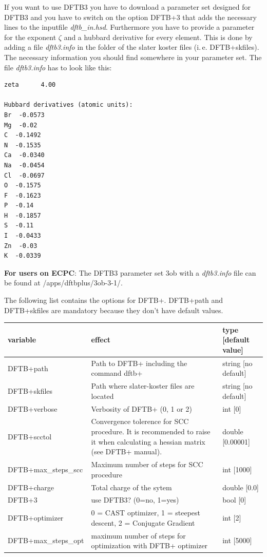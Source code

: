 \documentclass[10pt,a4paper]{article} %
\begin{document}
If you want to use DFTB3 you have to download a parameter set designed for DFTB3 and you have to switch on the option DFTB+3 that adds the necessary lines to the inputfile \textit{dftb\_in.hsd}. Furthermore you have to provide a parameter for the exponent $\zeta$ and a hubbard derivative for every element. This is done by adding a file \textit{dftb3.info} in the folder of the slater koster files (i.\,e. DFTB+skfiles). The necessary information you should find somewhere in your parameter set. The file \textit{dftb3.info} has to look like this:

\begin{lstlisting}
zeta	  4.00	

Hubbard derivatives (atomic units):
Br  -0.0573	
Mg  -0.02
C  -0.1492	
N  -0.1535
Ca  -0.0340	
Na  -0.0454
Cl  -0.0697	
O  -0.1575
F  -0.1623	
P  -0.14
H  -0.1857	
S  -0.11
I  -0.0433	
Zn  -0.03
K  -0.0339		
\end{lstlisting}

\textbf{For users on ECPC}: The DFTB3 parameter set 3ob with a \textit{dftb3.info} file can be found at /apps/dftbplus/3ob-3-1/.


The following list contains the options for DFTB+. DFTB+path and DFTB+skfiles are mandatory because they don't have default values.

		\begin{longtable}{|p{3.5cm}|p{5cm}|p{3cm}|}
		variable & effect & type [default value] \\
		\hline
			DFTB+path  & Path to DFTB+ including the command dftb+ & string [no default]\\
			DFTB+skfiles  & Path where slater-koster files are located & string [no default]\\
			DFTB+verbose & Verbosity of DFTB+ (0, 1 or 2) & int [0]\\
			DFTB+scctol & Convergence tolerence for SCC procedure. It is recommended to raise it when calculating a hessian matrix (see DFTB+ manual). & double [0.00001]\\
      DFTB+max\_steps\_scc & Maximum number of steps for SCC procedure & int [1000]\\
			DFTB+charge & Total charge of the sytem & double [0.0] \\
			DFTB+3 & use DFTB3? (0=no, 1=yes) & bool [0] \\
			DFTB+optimizer & 0 = CAST optimizer, 1 = steepest descent, 2 = Conjugate Gradient & int [2] \\
			DFTB+max\_steps\_opt & maximum number of steps for optimization with DFTB+ optimizer & int [5000] \\
		\end{longtable}~\\
		
\end{document}
